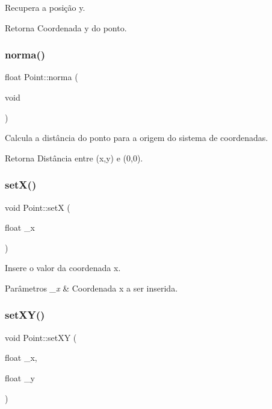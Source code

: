 Recupera a posição y. 

\begin{DoxyReturn}{Retorna}
Coordenada y do ponto. 
\end{DoxyReturn}
\mbox{\label{class_point_aa3005a9d97e2cb05624414973a214788}} 
\subsubsection{\texorpdfstring{norma()}{norma()}}
{\footnotesize\ttfamily float Point\+::norma (\begin{DoxyParamCaption}\item[{void}]{ }\end{DoxyParamCaption})}



Calcula a distância do ponto para a origem do sistema de coordenadas. 

\begin{DoxyReturn}{Retorna}
Distância entre (x,y) e (0,0). 
\end{DoxyReturn}
\mbox{\label{class_point_a428a1676e2fdec6753c42011a1d59d18}} 
\subsubsection{\texorpdfstring{set\+X()}{setX()}}
{\footnotesize\ttfamily void Point\+::setX (\begin{DoxyParamCaption}\item[{float}]{\+\_\+x }\end{DoxyParamCaption})}



Insere o valor da coordenada x. 


\begin{DoxyParams}{Parâmetros}
{\em \+\_\+x} & Coordenada x a ser inserida. \\
\hline
\end{DoxyParams}
\mbox{\label{class_point_ab5385c6d9bfa841e641e4709fc9f14cc}} 
\subsubsection{\texorpdfstring{set\+X\+Y()}{setXY()}}
{\footnotesize\ttfamily void Point\+::set\+XY (\begin{DoxyParamCaption}\item[{float}]{\+\_\+x,  }\item[{float}]{\+\_\+y }\end{DoxyParamCaption})}



